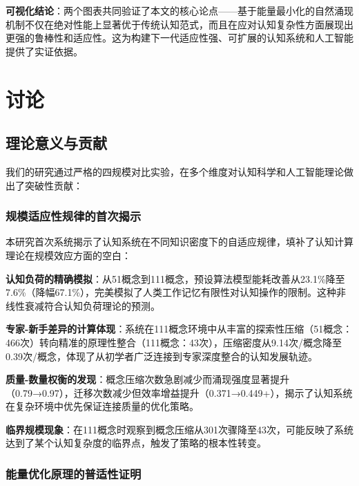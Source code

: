 \documentclass[12pt,a4paper]{article}
\begin{document}
\textbf{可视化结论}：两个图表共同验证了本文的核心论点——基于能量最小化的自然涌现机制不仅在绝对性能上显著优于传统认知范式，而且在应对认知复杂性方面展现出更强的鲁棒性和适应性。这为构建下一代适应性强、可扩展的认知系统和人工智能提供了实证依据。

\section{讨论}

\subsection{理论意义与贡献}

我们的研究通过严格的四规模对比实验，在多个维度对认知科学和人工智能理论做出了突破性贡献：

\subsubsection{规模适应性规律的首次揭示}

本研究首次系统揭示了认知系统在不同知识密度下的自适应规律，填补了认知计算理论在规模效应方面的空白：

\textbf{认知负荷的精确模拟}：从51概念到111概念，预设算法模型能耗改善从23.1\%降至7.6\%（降幅67.1\%），完美模拟了人类工作记忆有限性对认知操作的限制。这种非线性衰减符合认知负荷理论的预测。

\textbf{专家-新手差异的计算体现}：系统在111概念环境中从丰富的探索性压缩（51概念：466次）转向精准的原理性整合（111概念：43次），压缩密度从9.14次/概念降至0.39次/概念，体现了从初学者广泛连接到专家深度整合的认知发展轨迹。

\textbf{质量-数量权衡的发现}：概念压缩次数急剧减少而涌现强度显著提升（0.79→0.97），迁移次数减少但效率增益提升（0.371→0.449+），揭示了认知系统在复杂环境中优先保证连接质量的优化策略。

\textbf{临界规模现象}：在111概念时观察到概念压缩从301次骤降至43次，可能反映了系统达到了某个认知复杂度的临界点，触发了策略的根本性转变。

\subsubsection{能量优化原理的普适性证明}
\end{document}
